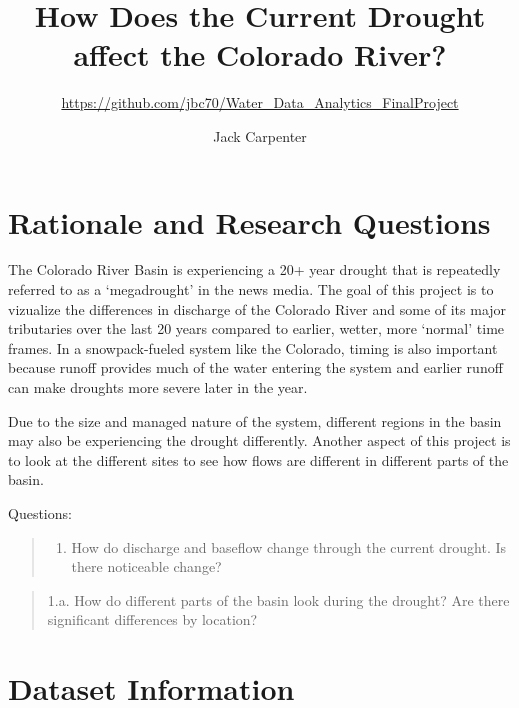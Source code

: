 \documentclass[
  12pt,
]{article}
\title{How Does the Current Drought affect the Colorado River?}
\subtitle{\url{https://github.com/jbc70/Water_Data_Analytics_FinalProject}}
\author{Jack Carpenter}
\date{}
\providecommand{\tightlist}{%
  \setlength{\itemsep}{0pt}\setlength{\parskip}{0pt}}
\begin{document}
\maketitle

\newpage

\hypertarget{rationale-and-research-questions}{%
\section{Rationale and Research
Questions}\label{rationale-and-research-questions}}

The Colorado River Basin is experiencing a 20+ year drought that is
repeatedly referred to as a `megadrought' in the news media. The goal of
this project is to vizualize the differences in discharge of the
Colorado River and some of its major tributaries over the last 20 years
compared to earlier, wetter, more `normal' time frames. In a
snowpack-fueled system like the Colorado, timing is also important
because runoff provides much of the water entering the system and
earlier runoff can make droughts more severe later in the year.

Due to the size and managed nature of the system, different regions in
the basin may also be experiencing the drought differently. Another
aspect of this project is to look at the different sites to see how
flows are different in different parts of the basin.

Questions:

\begin{quote}
\begin{enumerate}
\def\labelenumi{\arabic{enumi}.}
\tightlist
\item
  How do discharge and baseflow change through the current drought. Is
  there noticeable change?
\end{enumerate}
\end{quote}

\begin{quote}
1.a. How do different parts of the basin look during the drought? Are
there significant differences by location?
\end{quote}

\newpage

\hypertarget{dataset-information}{%
\section{Dataset Information}\label{dataset-information}}
\end{document}
